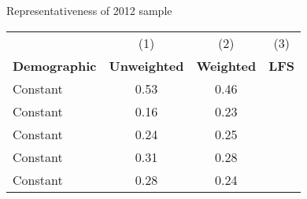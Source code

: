 \begin{center}
\begin{threeparttable}[!h]
\caption{Representativeness of 2012 sample}
\begin{tabular}{lccc}
\toprule
\toprule
&\multicolumn{1}{c}{(1)}&\multicolumn{1}{c}{(2)}&\multicolumn{1}{c}{(3)} \\
\textbf{Demographic}&\multicolumn{1}{c}{\textbf{Unweighted}}&\multicolumn{1}{c}{\textbf{Weighted}}&\multicolumn{1}{c}{\textbf{LFS}} \\
\midrule
Constant            &        0.53&        0.46\\
Constant            &        0.16&        0.23\\
Constant            &        0.24&        0.25\\
Constant            &        0.31&        0.28\\
Constant            &        0.28&        0.24\\
\bottomrule
\bottomrule
\end{tabular}
\end{threeparttable}
\end{center}
